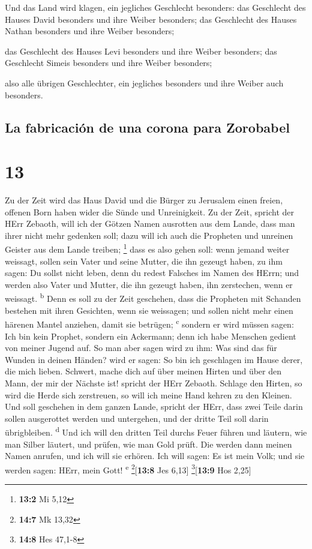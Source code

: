  Und das Land wird klagen, ein jegliches Geschlecht
besonders: das Geschlecht des Hauses David besonders und ihre Weiber
besonders; das Geschlecht des Hauses Nathan besonders und ihre Weiber
besonders;

 das Geschlecht des Hauses Levi besonders und ihre Weiber
besonders; das Geschlecht Simeis besonders und ihre Weiber besonders;

 also alle übrigen Geschlechter, ein jegliches besonders
und ihre Weiber auch besonders.

\hypertarget{la-fabricaciuxf3n-de-una-corona-para-zorobabel}{%
\subsection{La fabricación de una corona para
Zorobabel}\label{la-fabricaciuxf3n-de-una-corona-para-zorobabel}}

\hypertarget{section-12}{%
\section{13}\label{section-12}}

 Zu der Zeit wird das Haus David und die Bürger zu
Jerusalem einen freien, offenen Born haben wider die Sünde und
Unreinigkeit.  Zu der Zeit, spricht der HErr Zebaoth, will
ich der Götzen Namen ausrotten aus dem Lande, dass man ihrer nicht mehr
gedenken soll; dazu will ich auch die Propheten und unreinen Geister aus
dem Lande treiben; \footnote{\textbf{13:2} Mi 5,12}  dass
es also gehen soll: wenn jemand weiter weissagt, sollen sein Vater und
seine Mutter, die ihn gezeugt haben, zu ihm sagen: Du sollst nicht
leben, denn du redest Falsches im Namen des HErrn; und werden also Vater
und Mutter, die ihn gezeugt haben, ihn zerstechen, wenn er weissagt.
\textsuperscript{b}  Denn es soll zu der Zeit geschehen,
dass die Propheten mit Schanden bestehen mit ihren Gesichten, wenn sie
weissagen; und sollen nicht mehr einen härenen Mantel anziehen, damit
sie betrügen; \textsuperscript{c}  sondern er wird müssen
sagen: Ich bin kein Prophet, sondern ein Ackermann; denn ich habe
Menschen gedient von meiner Jugend auf.  So man aber sagen
wird zu ihm: Was sind das für Wunden in deinen Händen? wird er sagen: So
bin ich geschlagen im Hause derer, die mich lieben. 
Schwert, mache dich auf über meinen Hirten und über den Mann, der mir
der Nächste ist! spricht der HErr Zebaoth. Schlage den Hirten, so wird
die Herde sich zerstreuen, so will ich meine Hand kehren zu den Kleinen.
 Und soll geschehen in dem ganzen Lande, spricht der HErr,
dass zwei Teile darin sollen ausgerottet werden und untergehen, und der
dritte Teil soll darin übrigbleiben. \textsuperscript{d} 
Und ich will den dritten Teil durchs Feuer führen und läutern, wie man
Silber läutert, und prüfen, wie man Gold prüft. Die werden dann meinen
Namen anrufen, und ich will sie erhören. Ich will sagen: Es ist mein
Volk; und sie werden sagen: HErr, mein Gott! \textsuperscript{e}
\footnote{\textbf{14:7} Mk 13,32}{[}\textbf{13:8} Jes 6,13{]}
\footnote{\textbf{14:8} Hes 47,1-8}{[}\textbf{13:9} Hos 2,25{]}

